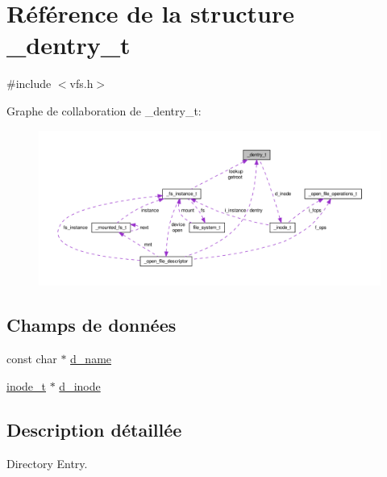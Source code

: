\hypertarget{struct__dentry__t}{\section{\-Référence de la structure \-\_\-dentry\-\_\-t}
\label{struct__dentry__t}
}


{\ttfamily \#include $<$vfs.\-h$>$}



\-Graphe de collaboration de \-\_\-dentry\-\_\-t\-:\nopagebreak
\begin{figure}[H]
\begin{center}
\leavevmode
\includegraphics[width=350pt]{struct__dentry__t__coll__graph}
\end{center}
\end{figure}
\subsection*{\-Champs de données}
\begin{DoxyCompactItemize}
\item 
const char $\ast$ \hyperlink{struct__dentry__t_ac9b991f6f5d5c5ce60e8d256d667265e}{d\-\_\-name}
\item 
\hyperlink{vfs_8h_af51b41660b60ad79b490887fe6e22da9}{inode\-\_\-t} $\ast$ \hyperlink{struct__dentry__t_ac711731a0c08b35b5d2731b8545c7454}{d\-\_\-inode}
\end{DoxyCompactItemize}


\subsection{\-Description détaillée}
\-Directory \-Entry. 

